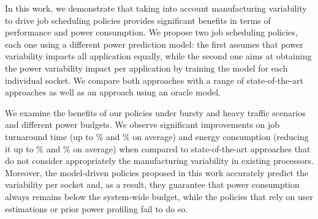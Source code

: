 In this work, we demonstrate that taking into account manufacturing variability
to drive job scheduling policies provides significant benefits in terms of
performance and power consumption.  We propose two job scheduling policies,
each one using a different power prediction model: the first assumes that power
variability impacts all application equally, while the second one aims at
obtaining the power variability impact per application by training the model for
each individual socket. We compare both approaches with a range of
state-of-the-art approaches as well as an approach using an oracle model. 
\par
We examine the benefits of our policies under bursty and heavy traffic scenarios
and different power budgets.  We observe significant improvements on job
turnaround time (up to \MaxJTT\% and \AvgJTT\% on average) and energy
consumption (reducing it up to \MaxEnergy\% and \AvgEnergy\% on average) when
compared to state-of-the-art approaches that do not consider appropriately the
manufacturing variability in existing processors.  Moreover, the model-driven
policies proposed in this work accurately predict the variability per socket
and, as a result, they guarantee that power consumption always remains below
the system-wide budget, while the policies that rely on user estimations or
prior power profiling fail to do so.  

